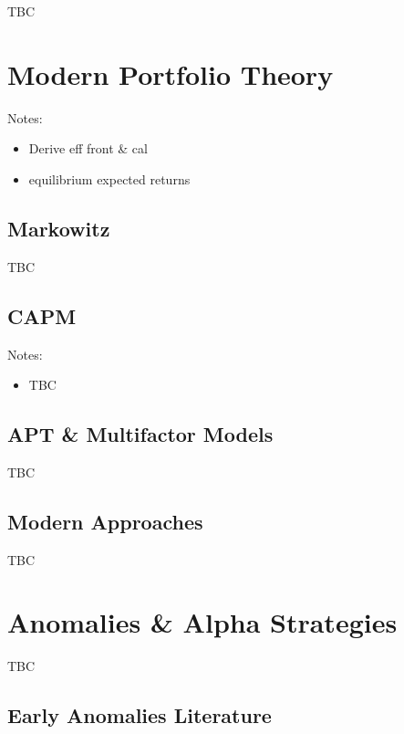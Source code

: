\documentclass[]{book}
\providecommand{\tightlist}{%
  \setlength{\itemsep}{0pt}\setlength{\parskip}{0pt}}
\theoremstyle{definition}
\theoremstyle{definition}
\theoremstyle{definition}
\theoremstyle{remark}
\begin{document}
TBC

\chapter{Modern Portfolio Theory}\label{mpt}

Notes:

\begin{itemize}
\tightlist
\item
  Derive eff front \& cal
\item
  equilibrium expected returns
\end{itemize}

\section{Markowitz}\label{markowitz}

TBC

\section{CAPM}\label{capm}

Notes:

\begin{itemize}
\tightlist
\item
  TBC
\end{itemize}

\section{APT \& Multifactor Models}\label{apt-multifactor-models}

TBC

\section{Modern Approaches}\label{modern-approaches}

TBC

\chapter{Anomalies \& Alpha Strategies}\label{anomalies}

TBC

\section{Early Anomalies Literature}\label{early-anomalies-literature}
\end{document}

